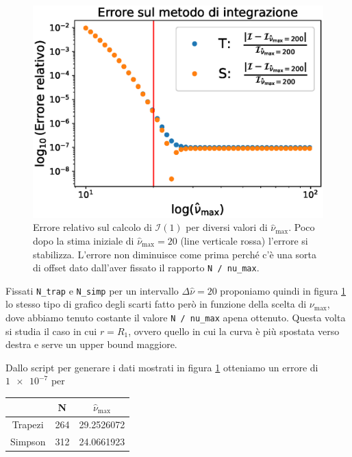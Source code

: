\documentclass[a4paper, titlepage]{article}
\begin{document}
\begin{figure}[h]
\begin{minipage}{0.49 \textwidth}
        \includegraphics[width = \textwidth]{Figures/Pot_cvgA.eps}
        \caption{Errore relativo sul calcolo di $\mathcal I (1)$ per diversi valori di $\hat \nu_\text{max}$.
        Poco dopo la stima iniziale di  $\hat \nu_\text{max} = \num{20}$ (line verticale rossa) l'errore si stabilizza.
        L'errore non diminuisce come prima perché c'è una sorta di offset dato dall'aver fissato il rapporto \texttt{N / nu\_max}.}
        \label{fig:Pot_cvgA}
    \end{minipage}
\end{figure}

Fissati \texttt{N\_trap} e \texttt{N\_simp} per un intervallo $\Delta \hat \nu = 20$ proponiamo quindi in figura \ref{fig:Pot_cvgA} lo stesso tipo di grafico degli scarti fatto però in funzione della scelta di $\nu_\text{max}$, dove abbiamo tenuto costante il valore \texttt{N / nu\_max} apena ottenuto.
Questa volta si studia il caso in cui $r = R_1$, ovvero quello in cui la curva è più spostata verso destra e serve un upper bound maggiore.

Dallo script per generare i dati mostrati in figura \ref{fig:Pot_cvgA} otteniamo un errore di $\num{1e-7}$ per

\begin{table}[h]
    \centering
    \begin{tabular}{ccc}
         & N & $\hat \nu_\text{max}$ \\
        \hline
        Trapezi & 264 & 29.2526072 \\
        \hline
        Simpson & 312 & 24.0661923 \\
    \end{tabular}
\end{table}
\end{document}
